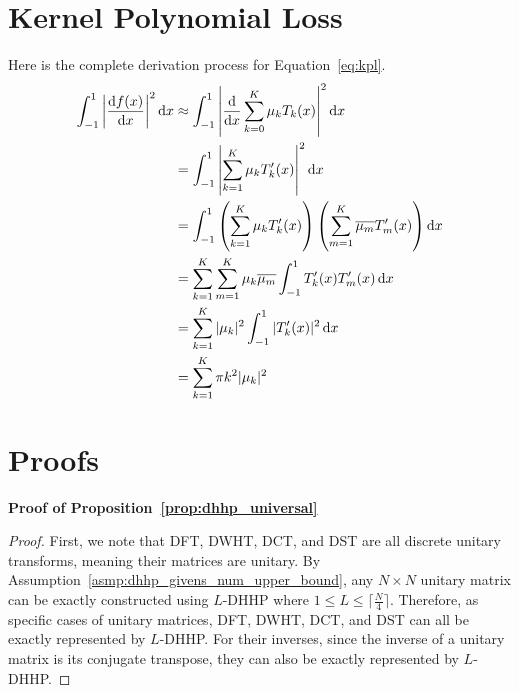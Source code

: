 \section{Kernel Polynomial Loss}
Here is the complete derivation process for Equation~\ref{eq:kpl}.
\begin{equation}
\centering
\begin{split}
\int_{-1}^{1}\left|\frac{\diff{f(x)}}{\diff{x}}\right|^{2}\diff{x}
&\approx \int_{-1}^{1}\left|\frac{\diff}{\diff{x}}\sum_{k=0}^{K}\mu_{k}T_k(x)\right|^{2}\diff{x} \\
&= \int_{-1}^{1}\left|\sum_{k=1}^{K}\mu_{k}T'_k(x)\right|^{2}\diff{x} \\
&= \int_{-1}^{1}\left(\sum_{k=1}^{K}\mu_{k}T'_k(x)\right)\left(\sum_{m=1}^{K}\overline{\mu_{m}}T'_m(x)\right)\diff{x} \\
&= \sum_{k=1}^{K}\sum_{m=1}^{K}\mu_{k}\overline{\mu_{m}}\int_{-1}^{1}T'_k(x)T'_m(x)\diff{x} \\
&= \sum_{k=1}^{K}|\mu_{k}|^{2}\int_{-1}^{1}|T'_k(x)|^{2}\diff{x} \\
&= \sum_{k=1}^{K}\pi k^{2}|\mu_{k}|^{2}
\end{split}
\end{equation}

\section{Proofs}
\noindent\textbf{Proof of Proposition~\ref{prop:dhhp_universal}}
\begin{proof}
First, we note that DFT, DWHT, DCT, and DST are all discrete unitary transforms, meaning their matrices are unitary. By Assumption~\ref{asmp:dhhp_givens_num_upper_bound}, any $N \times N$ unitary matrix can be exactly constructed using $L$-DHHP where $1 \leq L \leq \lceil\frac{N}{4}\rceil$. Therefore, as specific cases of unitary matrices, DFT, DWHT, DCT, and DST can all be exactly represented by $L$-DHHP. For their inverses, since the inverse of a unitary matrix is its conjugate transpose, they can also be exactly represented by $L$-DHHP.
\end{proof}

